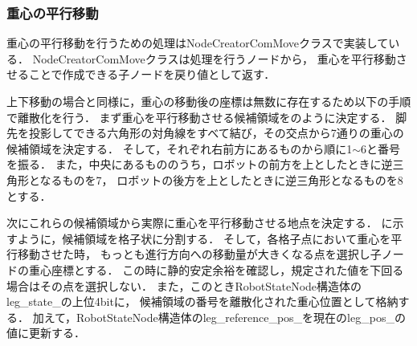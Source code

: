 \subsubsection{重心の平行移動}
重心の平行移動を行うための処理はNodeCreatorComMoveクラスで実装している．
NodeCreatorComMoveクラスは処理を行うノードから，
重心を平行移動させることで作成できる子ノードを戻り値として返す．

上下移動の場合と同様に，重心の移動後の座標は無数に存在するため以下の手順で離散化を行う．
まず重心を平行移動させる候補領域をのように決定する．
脚先を投影してできる六角形の対角線をすべて結び，その交点から7通りの重心の候補領域を決定する．
そして，それぞれ右前方にあるものから順に1$\sim$6と番号を振る．
また，中央にあるもののうち，ロボットの前方を上としたときに逆三角形となるものを7，
ロボットの後方を上としたときに逆三角形となるものを8とする．

次にこれらの候補領域から実際に重心を平行移動させる地点を決定する．
に示すように，候補領域を格子状に分割する．
そして，各格子点において重心を平行移動させた時，
もっとも進行方向への移動量が大きくなる点を選択し子ノードの重心座標とする．
この時に静的安定余裕を確認し，規定された値を下回る場合はその点を選択しない．
また，このときRobotStateNode構造体のleg\_state\_の上位4bitに，
候補領域の番号を離散化された重心位置として格納する．
加えて，RobotStateNode構造体のleg\_reference\_pos\_を現在のleg\_pos\_の値に更新する．

